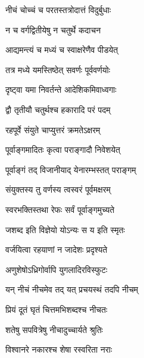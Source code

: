 {नीचं चोच्चं च परतस्तत्रोदात्तं विदुर्बुधाः}

{न च वर्गद्वितीयेषु न चतुर्थे कदाचन}

{आद्यमन्त्यं च मध्यं च स्वाक्षरेणैव पीडयेत्}

{तत्र मध्ये यमस्तिष्ठेत् सवर्णः पूर्ववर्णयोः}

{दृष्ट्वा यमा निवर्तन्ते आदेशिकमिवाध्वगाः}

{द्वौ तृतीयौ चतुर्थश्च हकारादि परं पदम्}

{रहपूर्वे संयुते चाप्युत्तरं क्रमतेऽक्षरम्}

{पूर्वाङ्गमादितः कृत्वा पराङ्गादौ निवेशयेत्}

{पूर्वाङ्गं तद् विजानीयाद् येनारम्भस्तत् पराङ्गम्}

{संयुक्तस्य तु वर्णस्य त्वस्वरं पूर्वमक्षरम्}

{स्वरभक्तिस्तथा रेफः सर्वं पूर्वाङ्गमुच्यते}

{जशब्द इति विज्ञेयो योऽन्यः स य इति स्मृतः}

{वर्जयित्वा रहयाणां न जादेशः प्रदृश्यते}

{अणुशेषोऽध्रिगोर्वापि युगलादिरविस्फुटः}

\closesub

\resetShloka

{यन् नीचं नीचमेव तद् यत् प्रचयस्थं तदपि नीचम्}

{प्रियं दूतं घृतं चित्तमभिशब्दश्च नीचतः}

{शतेषु सपवित्रेषु नीचादुच्चार्यते श्रुतिः}

{विश्वानरे नकारश्च शेषा रस्वरिता नराः}

